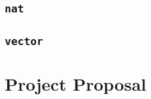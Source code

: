 \documentclass[12pt,a4paper,twoside]{report}
\begin{document}
\section{\texttt{nat}}


\section{\texttt{vector}}


\clearpage
\markboth{}{}

\chapter*{Project Proposal}

\end{document}
